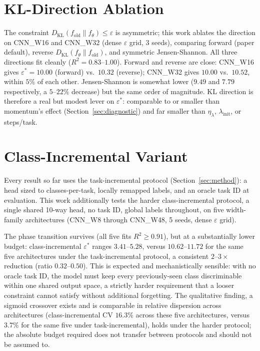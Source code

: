 \documentclass[11pt]{article}
\newcommand{\eps}{\varepsilon}
\newcommand{\epsstar}{\eps^{*}}
\begin{document}
\section{KL-Direction Ablation}
\label{sec:klablation}
The constraint $D_{\mathrm{KL}}(f_{\mathrm{old}}\|f_\theta)\le\eps$ is
asymmetric; this work ablates the direction on CNN\_W16 and CNN\_W32 (dense $\eps$
grid, 3 seeds), comparing forward (paper default), reverse
$D_{\mathrm{KL}}(f_\theta\|f_{\mathrm{old}})$, and symmetric
Jensen-Shannon. All three directions fit cleanly ($R^2=0.83$--$1.00$).
Forward and reverse are close: CNN\_W16 gives $\epsstar=10.00$ (forward)
vs.\ $10.32$ (reverse); CNN\_W32 gives $10.00$ vs.\ $10.52$, within
$5\%$ of each other. Jensen-Shannon is somewhat lower ($9.49$ and $7.79$
respectively, a $5$--$22\%$ decrease) but the same order of magnitude.
KL direction is therefore a real but modest lever on $\epsstar$:
comparable to or smaller than momentum's effect
(Section~\ref{sec:diagnostic}) and far smaller than $\eta_\lambda$,
$\lambda_{\mathrm{init}}$, or steps/task.

\section{Class-Incremental Variant}
\label{sec:classincremental}
Every result so far uses the task-incremental protocol (Section~\ref{sec:method}):
a head sized to classes-per-task, locally remapped labels, and an oracle
task ID at evaluation. This work additionally tests the harder class-incremental
protocol, a single shared 10-way head, no task ID, global labels
throughout, on five width-family architectures (CNN\_W8 through
CNN\_W48, 5 seeds, dense $\eps$ grid).

The phase transition survives (all five fits $R^2\ge0.91$), but at a
substantially lower budget: class-incremental $\epsstar$ ranges $3.41$--$5.28$,
versus $10.62$--$11.72$ for the same five architectures under the
task-incremental protocol, a consistent $2$--$3\times$ reduction
(ratio $0.32$--$0.50$). This is expected and mechanistically sensible: with
no oracle task ID, the model must keep every previously-seen class
discriminable within one shared output space, a strictly harder requirement
that a looser constraint cannot satisfy without additional forgetting. The
qualitative finding, a sigmoid crossover exists and is comparable in
relative dispersion across architectures (class-incremental CV $16.3\%$
across these five architectures, versus $3.7\%$ for the same five under
task-incremental), holds under the harder protocol; the absolute budget
required does not transfer between protocols and should not be assumed to.
\end{document}
